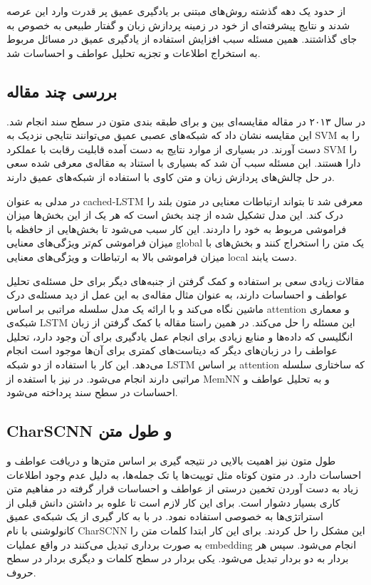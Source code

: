 \documentclass[12pt, a4paper, oneside]{report}
\begin{document}
از حدود یک دهه گذشته روش‌های مبتنی بر یادگیری عمیق پر قدرت وارد این عرصه شدند و نتایج پیشرفته‌ای
از خود در زمینه پردازش زبان و گفتار طبیعی به خصوص
به جای گذاشتند.
همین مسئله سبب افزایش استفاده از یادگیری عمیق در مسائل مربوط به استخراج اطلاعات و تجزیه تحلیل
عواطف و احساسات شد.
\cite{zhang2018deep}

\subsection{بررسی چند مقاله}

در سال ۲۰۱۳ در مقاله
\cite{Moraes2013DocumentlevelSC}
مقایسه‌ای بین
و
برای طبقه بندی متون در سطح سند انجام شد. این مقایسه نشان داد که شبکه‌‌های عصبی عمیق می‌توانند نتایجی نزدیک به
SVM
را به دست آورند. در بسیاری از موارد نتایج به دست آمده قابلیت رقابت با عملکرد‌
SVM
را دارا هستند. این مسئله سبب آن شد که بسیاری با استناد به مقاله‌ی معرفی شده سعی در حل چالش‌های پردازش زبان و متن کاوی
با استفاده از شبکه‌های عمیق دارند.

در
\cite{xu2016cached}
مدلی به عنوان
cached-LSTM
معرفی شد تا بتواند ارتباطات معنایی در متون بلند را درک کند. این مدل تشکیل شده از چند بخش است که هر یک از این
بخش‌ها میزان فراموشی مربوط به خود را داردند. این کار سبب می‌شود تا بخش‌هایی از حافظه با میزان فراموشی کم‌تر ویژگی‌های
معنایی
global
یک متن را استخراج کنند و بخش‌های با میزان فراموشی بالا به ارتباطات و ویژگی‌های معنایی
local
دست یابند.

مقالات زیادی سعی بر استفاده و کمک گرفتن از جنبه‌های دیگر برای حل مسئله‌ی تحلیل عواطف و احساسات دارند،
به عنوان مثال مقاله‌ی
\cite{yin-etal-2017-document}
به این عمل از دید مسئله‌ی درک ماشین نگاه می‌کند و با ارائه یک مدل سلسله مراتبی بر اساس
attention
و معماری شبکه‌ی
LSTM
این مسئله را حل می‌کند.
در همین راستا مقاله
\cite{zhou-etal-2016-attention}
با کمک گرفتن از زبان انگلیسی که داده‌ها و منابع زیادی برای انجام عمل یادگیری برای آن وجود دارد، تحلیل
عواطف را در زبان‌های دیگر که دیتاست‌های کمتری برای آن‌ها موجود است انجام می‌دهد. این کار با استفاده از دو شبکه
LSTM
بر اساس
attention
که ساختاری سلسله مراتبی دارند انجام می‌شود.
در
\cite{ijcai2017-311}
نیز با استفده از
MemNN
و
به تحلیل عواطف و احساسات در سطح سند پرداخته می‌شود.

\subsection{CharSCNN و طول متن}

طول متون نیز اهمیت بالایی در نتیجه گیری بر اساس متن‌ها و دریافت عواطف و احساسات دارد.
در متون کوتاه مثل توییت‌ها یا تک جمله‌ها، به دلیل عدم وجود اطلاعات زیاد به دست آوردن تخمین درستی از
عواطف و احساسات قرار گرفته در مفاهیم متن کاری بسیار دشوار است.
برای این کار لازم است تا علوه بر داشتن دانش قبلی از استراتژی‌ها به خصوصی استفاده نمود.
در
\cite{dos2014deep}
با به کار گیری از یک شبکه‌ی عمیق کانولوشنی با نام
CharSCNN
این مشکل را حل کردند. برای این کار ابتدا کلمات متن را به صورت برداری تبدیل می‌کنند در واقع عملیات
embedding
انجام می‌شود. سپس هر بردار به دو بردار تبدیل می‌شود. یکی بردار در سطح کلمات و دیگری بردار در سطح حروف.
\end{document}
